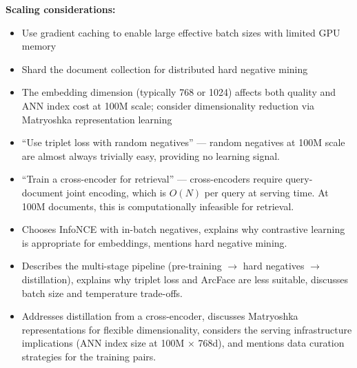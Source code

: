 \begin{interviewq}
\textbf{Scaling considerations:}
\begin{itemize}
    \item Use gradient caching to enable large effective batch sizes with limited GPU memory
    \item Shard the document collection for distributed hard negative mining
    \item The embedding dimension (typically 768 or 1024) affects both quality and ANN index cost at 100M scale; consider dimensionality reduction via Matryoshka representation learning
\end{itemize}

\redflags
\begin{itemize}
    \item ``Use triplet loss with random negatives'' --- random negatives at 100M scale are almost always trivially easy, providing no learning signal.
    \item ``Train a cross-encoder for retrieval'' --- cross-encoders require query-document joint encoding, which is $O(N)$ per query at serving time. At 100M documents, this is computationally infeasible for retrieval.
\end{itemize}


\goodgreat
\begin{itemize}
    \item {} Chooses InfoNCE with in-batch negatives, explains why contrastive learning is appropriate for embeddings, mentions hard negative mining.
    \item {} Describes the multi-stage pipeline (pre-training $\to$ hard negatives $\to$ distillation), explains why triplet loss and ArcFace are less suitable, discusses batch size and temperature trade-offs.
    \item {} Addresses distillation from a cross-encoder, discusses Matryoshka representations for flexible dimensionality, considers the serving infrastructure implications (ANN index size at 100M $\times$ 768d), and mentions data curation strategies for the training pairs.
\end{itemize}

\end{interviewq}


